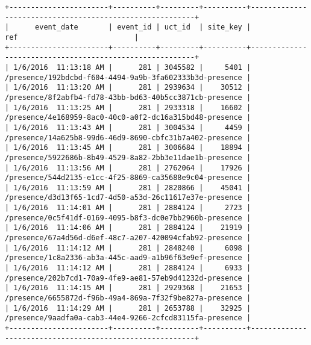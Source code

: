 \begin{sidewaysfigure}
    \centering
    \begin{mdframed}[topline=false,rightline=false,leftline=false]
    \centering
\begin{BVerbatim}
+-----------------------+----------+---------+----------+---------------------------------------------------------+
|      event_date       | event_id | uct_id  | site_key |                           ref                           |
+-----------------------+----------+---------+----------+---------------------------------------------------------+
| 1/6/2016  11:13:18 AM |      281 | 3045582 |     5401 | /presence/192bdcbd-f604-4494-9a9b-3fa602333b3d-presence |
| 1/6/2016  11:13:20 AM |      281 | 2939634 |    30512 | /presence/8f2abfb4-fd78-43bb-bd63-40b5cc3871cb-presence |
| 1/6/2016  11:13:25 AM |      281 | 2933318 |    16602 | /presence/4e168959-8ac0-40c0-a0f2-dc16a315bd48-presence |
| 1/6/2016  11:13:43 AM |      281 | 3004534 |     4459 | /presence/14a625b8-99d6-46d9-8690-cbfc31b7a402-presence |
| 1/6/2016  11:13:45 AM |      281 | 3006684 |    18894 | /presence/5922686b-8b49-4529-8a82-2bb3e11dae1b-presence |
| 1/6/2016  11:13:56 AM |      281 | 2762064 |    17926 | /presence/544d2135-e1cc-4f25-8869-ca35688e9c04-presence |
| 1/6/2016  11:13:59 AM |      281 | 2820866 |    45041 | /presence/d3d13f65-1cd7-4d50-a53d-26c11617e37e-presence |
| 1/6/2016  11:14:01 AM |      281 | 2884124 |     2723 | /presence/0c5f41df-0169-4095-b8f3-dc0e7bb2960b-presence |
| 1/6/2016  11:14:06 AM |      281 | 2884124 |    21919 | /presence/67a4d56d-d6ef-48c7-a207-420094cfab92-presence |
| 1/6/2016  11:14:12 AM |      281 | 2848240 |     6098 | /presence/1c8a2336-ab3a-445c-aad9-a1b96f63e9ef-presence |
| 1/6/2016  11:14:12 AM |      281 | 2884124 |     6933 | /presence/202b7cd1-70a9-4fe9-ae81-57eb9d41232d-presence |
| 1/6/2016  11:14:15 AM |      281 | 2929368 |    21653 | /presence/6655872d-f96b-49a4-869a-7f32f9be827a-presence |
| 1/6/2016  11:14:29 AM |      281 | 2653788 |    32925 | /presence/9aadfa0a-cab3-44e4-9266-2cfcd83115fa-presence |
+-----------------------+----------+---------+----------+---------------------------------------------------------+
\end{BVerbatim}
  \end{mdframed}
  \caption[Events data sample]{\textbf{Figure \ref{fig-sample-events}: Events data sample}}
  \label{fig-sample-events}
\end{sidewaysfigure}

